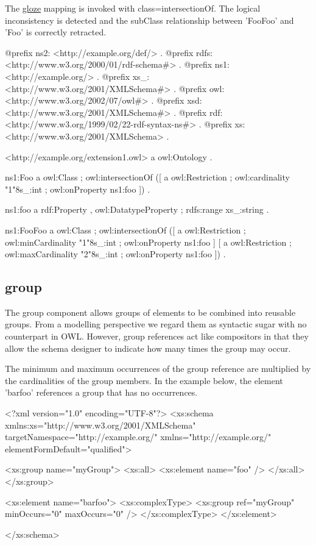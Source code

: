 The \hyperlink{namespacecom_1_1hp_1_1gloze}{gloze} mapping is invoked with class=intersectionOf. The logical inconsistency is detected and the subClass relationship between 'FooFoo' and 'Foo' is correctly retracted.


\begin{DoxyCodeInclude}
@prefix ns2:     <http://example.org/def/> .
@prefix rdfs:    <http://www.w3.org/2000/01/rdf-schema#> .
@prefix ns1:     <http://example.org/> .
@prefix xs_:     <http://www.w3.org/2001/XMLSchema#> .
@prefix owl:     <http://www.w3.org/2002/07/owl#> .
@prefix xsd:     <http://www.w3.org/2001/XMLSchema#> .
@prefix rdf:     <http://www.w3.org/1999/02/22-rdf-syntax-ns#> .
@prefix xs:      <http://www.w3.org/2001/XMLSchema> .

<http://example.org/extension1.owl>
      a       owl:Ontology .

ns1:Foo
      a       owl:Class ;
      owl:intersectionOf ([ a       owl:Restriction ;
                  owl:cardinality "1"^^xs_:int ;
                  owl:onProperty ns1:foo
                ]) .

ns1:foo
      a       rdf:Property , owl:DatatypeProperty ;
      rdfs:range xs_:string .

ns1:FooFoo
      a       owl:Class ;
      owl:intersectionOf ([ a       owl:Restriction ;
                  owl:minCardinality "1"^^xs_:int ;
                  owl:onProperty ns1:foo
                ] [ a       owl:Restriction ;
                  owl:maxCardinality "2"^^xs_:int ;
                  owl:onProperty ns1:foo
                ]) .
\end{DoxyCodeInclude}
 \hypertarget{group}{}\subsection{group}\label{group}
The group component allows groups of elements to be combined into reusable groups. From a modelling perspective we regard them as syntactic sugar with no counterpart in OWL. However, group references act like compositors in that they allow the schema designer to indicate how many times the group may occur.

The minimum and maximum occurrences of the group reference are multiplied by the cardinalities of the group members. In the example below, the element 'barfoo' references a group that has no occurrences.


\begin{DoxyCodeInclude}
<?xml version="1.0" encoding="UTF-8"?>
<xs:schema xmlns:xs="http://www.w3.org/2001/XMLSchema" 
        targetNamespace="http://example.org/" xmlns="http://example.org/"
        elementFormDefault="qualified">
        
        <xs:group name="myGroup">
                <xs:all>
                        <xs:element name="foo" />
                </xs:all>
        </xs:group>
        
        <xs:element name="barfoo">
                <xs:complexType>
                        <xs:group ref="myGroup" minOccurs="0" maxOccurs="0" />
                </xs:complexType>
        </xs:element>

</xs:schema>
\end{DoxyCodeInclude}
 
